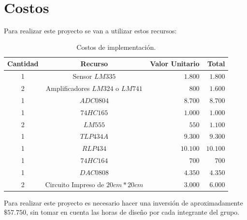 \documentclass[twocolumn]{IEEEtran}
\begin{document}
\section{Costos}
\noindent
Para realizar este proyecto se van a utilizar estos recursos:
\begin{table}[H]
	\centering
\begin{tabular}{|c|c|r|r|}\hline
 \textbf{Cantidad} & \textbf{Recurso} & \textbf{Valor Unitario} & \textbf{Total} \\ \hline
 1 & Sensor $LM335$ & $1.800$ & $1.800$ \\ \hline
 2 & Amplificadores $LM324$ o $LM741$ & $800$ & $1.600$ \\ \hline
 1 & $ADC0804$ & $8.700$ & $8.700$ \\ \hline
 1 & $74HC165$ & $1.000$ & $1.000$ \\ \hline
 2 & $LM555$ & $550$ & $1.100$ \\ \hline
 1 & $TLP434A$ & $9.300$ & $9.300$ \\ \hline
 1 & $RLP434$ & $10.100$ & $10.100$ \\ \hline
 1 & $74HC164$ & $700$ & $700$ \\ \hline
 1 & $DAC0808$ & $4.350$ & $4.350$ \\ \hline
 2 & Circuito Impreso de $20cm*20cm$ & $3.000$ & $6.000$ \\ \hline
    \end{tabular}
	\caption{Costos de implementación.}
	\label{tab1}
\end{table}
\noindent
Para realizar este proyecto es necesario hacer una inversión de aproximadamente $\$ 57.750$, sin tomar en cuenta las horas de diseño por cada integrante del grupo.
\end{document}
